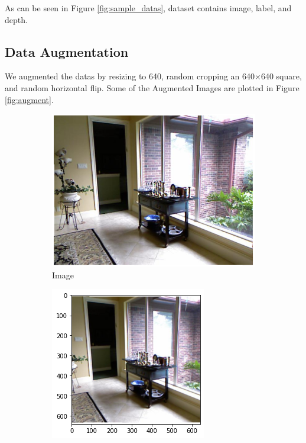 \documentclass[a4paper, openany]{book}
\begin{document}
As can be seen in Figure \ref{fig:sample_datas}, dataset contains image, label, and depth.

\newpage

\subsection{Data Augmentation}
	\vspace{0.3cm}
We augmented the datas by resizing to 640, random cropping an 640$\times$640 square, and random horizontal flip. Some of the Augmented Images are plotted in Figure \ref{fig:augment}.



\begin{figure}[ht]
  \centering
  \begin{subfigure}[b]{0.3\linewidth}
    \includegraphics[width=\linewidth]{images/imgNo1272.png}
    \caption{Image}
  \end{subfigure}
  \begin{subfigure}[b]{0.3\linewidth}
    \includegraphics[width=\linewidth]{images/aug_image.png}

\end{subfigure}
\end{figure}
\end{document}
